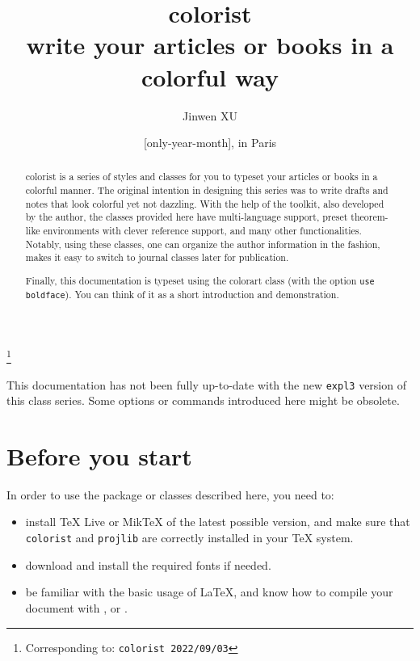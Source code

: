\documentclass[title in boldface, title in scshape, simple name]{colorart}
\newcommand{\classoption}[1]{\texttt{\textcolor{code-option}{#1}}}
\newenvironment{tip}[1][Tip]{%
    \begin{tcolorbox}[breakable,
        enhanced,
        width = \textwidth,
        colback = paper, colbacktitle = paper,
        colframe = gray!50, boxrule=0.2mm,
        coltitle = black,
        fonttitle = \sffamily,
        attach boxed title to top left = {yshift=-\tcboxedtitleheight/2, xshift=.5cm},
        boxed title style = {boxrule=0pt, colframe=paper},
        before skip = 0.3cm,
        after skip = 0.3cm,
        top = 3mm,
        bottom = 3mm,
        title={\scshape\sffamily #1}]%
}{\end{tcolorbox}}
\providecommand{\colorist}{\textsf{colorist}}
\providecommand{\colorart}{\textsf{colorart}}
\let\LevelOneTitle\section
\begin{document}
\def\PackageVersion{2022/09/03}

\title{{\normalfont\bfseries\color{main-text}\colorist{}}\\write your articles or books in a colorful way}
\author{Jinwen XU}
\thanks{Corresponding to: \texttt{\colorist{} \PackageVersion}}
\date{\TheDate{\PackageVersion}[only-year-month], in Paris}

\maketitle

\begin{abstract}
    \colorist{} is a series of styles and classes for you to typeset your articles or books in a colorful manner. The original intention in designing this series was to write drafts and notes that look colorful yet not dazzling. With the help of the \ProjLib{} toolkit, also developed by the author, the classes provided here have multi-language support, preset theorem-like environments with clever reference support, and many other functionalities. Notably, using these classes, one can organize the author information in the \AmS{} fashion, makes it easy to switch to journal classes later for publication.

    Finally, this documentation is typeset using the \colorart{} class (with the option \classoption{use boldface}). You can think of it as a short introduction and demonstration.
\end{abstract}


\begin{tip}
    This documentation has not been fully up-to-date with the new \texttt{expl3} version of this class series. Some options or commands introduced here might be obsolete.
\end{tip}

\setcounter{tocdepth}{2}
\tableofcontents


\medskip
\LevelOneTitle*{Before you start}
In order to use the package or classes described here, you need to:
\begin{itemize}
    \item install TeX Live or MikTeX of the latest possible version, and make sure that \texttt{colorist} and \texttt{projlib} are correctly installed in your \TeX{} system.
    \item download and install the required fonts if needed.
    \item be familiar with the basic usage of \LaTeX{}, and know how to compile your document with ,  or .
\end{itemize}
\end{document}
